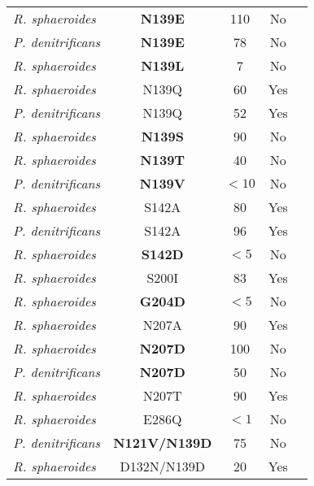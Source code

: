 \begin{table}
\begin{center}
\begin{singlespaced}
{\begin{tabular}{l|c|c|c|c}
    \emph{R. sphaeroides} & \textbf{N139E} & 110 & No & \cite{Zhu:2010p8237} \\
    \emph{P. denitrificans} & \textbf{N139E} & 78 & No & \cite{Durr:2008p6162} \\
    \emph{R. sphaeroides} & \textbf{N139L} & 7 & No & \cite{Zhu:2010p8237} \\
    \emph{R. sphaeroides} & N139Q & 60 & Yes & \cite{Zhu:2010p8237} \\
    \emph{P. denitrificans} & N139Q & 52 & Yes & \cite{Durr:2008p6162} \\
    \emph{R. sphaeroides} & \textbf{N139S} & 90 & No & \cite{Zhu:2010p8237} \\
    \emph{R. sphaeroides} & \textbf{N139T} & 40 & No & \cite{Lepp:2008p5615} \\
    \emph{P. denitrificans} & \textbf{N139V} & $<10$ & No & \cite{Pfitzner:2000p5484} \\
    \emph{R. sphaeroides} & S142A & 80 & Yes & \cite{Zhu:2010p8237} \\
    \emph{P. denitrificans} & S142A & 96 & Yes & \cite{Pfitzner:2000p5484} \\
    \emph{R. sphaeroides} & \textbf{S142D} & $<5$ & No & \cite{Zhu:2010p8237} \\
    \emph{R. sphaeroides} & S200I & 83 & Yes & \cite{Lee:2010p8614} \\
    \emph{R. sphaeroides} & \textbf{G204D} & $<5$ & No & \cite{Han:2005p5283} \\
    \emph{R. sphaeroides} & N207A & 90 & Yes & \cite{Zhu:2010p8237} \\
    \emph{R. sphaeroides} & \textbf{N207D} & 100 & No & \cite{Han:2006p5624} \\
    \emph{P. denitrificans} & \textbf{N207D} & 50 & No & \cite{Pfitzner:2000p5484} \\
    \emph{R. sphaeroides} & N207T & 90 & Yes & \cite{Zhu:2010p8237} \\
    \emph{R. sphaeroides} & E286Q & $<1$ & No & \cite{Adelroth:1997p5385} \\
    \emph{P. denitrificans} & \textbf{N121V/N139D} & 75 & No & \cite{Pfitzner:2000p5484} \\
    \emph{R. sphaeroides} & D132N/N139D & 20 & Yes & \cite{Branden:2006p9874} \\

\end{tabular}}
\end{singlespaced}
\end{center}
\end{table}
